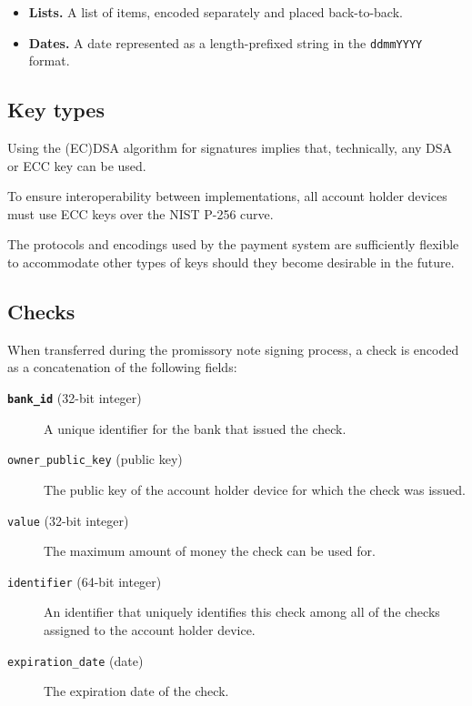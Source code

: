 \documentclass[12pt,a4paper]{article}
\begin{document}
\begin{multicols}{2}
\begin{itemize}
		\item \textbf{Lists.} A list of items, encoded separately and placed back-to-back.
		
		\item \textbf{Dates.} A date represented as a length-prefixed string in the \texttt{ddmmYYYY} format.
		
	\end{itemize}

	\subsection{Key types}
	\label{sec:key-types}

	Using the (EC)DSA algorithm for signatures implies that, technically, any DSA or ECC key can be used.
	
	To ensure interoperability between implementations, all account holder devices must use ECC keys over the NIST P-256 curve.

	The protocols and encodings used by the payment system are sufficiently flexible to accommodate other types of keys should they become desirable in the future.

	\subsection{Checks}
	
	When transferred during the promissory note signing process, a check is encoded as a concatenation of the following fields:
	
	\begin{description}
		\item[\textbf{\texttt{bank\_id}} (32-bit integer)] A unique identifier for the bank that issued the check.

		\item[\texttt{owner\_public\_key} (public key)] The public key of the account holder device for which the check was issued.

		\item[\texttt{value} (32-bit  integer)] The maximum amount of money the check can be used for.

		\item[\texttt{identifier} (64-bit integer)] An identifier that uniquely identifies this check among all of the checks assigned to the account holder device.
		
		\item[\texttt{expiration\_date} (date)] The expiration date of the check.


\end{description}
\end{multicols}
\end{document}
